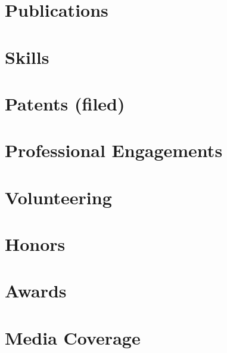 	
	
		
	
		
	
		

	\section{Publications}
	
	

	\section{Skills}

	

	\section{Patents (filed)}

	

	\section{Professional Engagements}

	

	\section{Volunteering}

	
	
	\section{Honors}
	
	

	\section{Awards}

	

	\section{Media Coverage}

	
	


